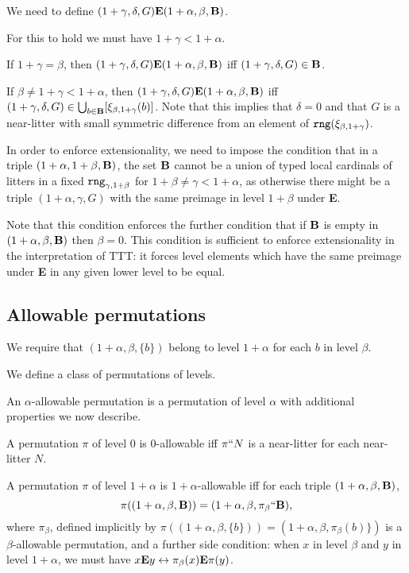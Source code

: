 \documentclass[12pt]{article}
\begin{document}
We need to define
$(1+\gamma,\delta,G) {\bf E} (1+\alpha,\beta,{\bf B})$.  

For this to hold we must have $1+\gamma<1+\alpha$.  

If $1+\gamma=\beta$, then $(1+\gamma,\delta,G) {\bf E} (1+\alpha,\beta,{\bf B})$ iff $(1+\gamma,\delta,G) \in {\bf B}$.  

If $\beta \neq 1+\gamma <1+\alpha$, then $(1+\gamma,\delta,G) {\bf E} (1+\alpha,\beta,{\bf B})$ iff $(1+\gamma,\delta,G) \in \bigcup_{b \in {\bf B}}[\xi_{\beta,1+\gamma}(b)]$.  Note that this implies
that $\delta=0$ and that $G$ is a near-litter with small symmetric difference from an element of ${\tt rng}(\xi_{\beta,1+\gamma})$.

In order to enforce extensionality, we need to impose the condition that in a triple $(1+\alpha,1+\beta,{\bf B})$, the set ${\bf B}$ cannot be a union of typed local cardinals of litters
in a fixed ${\tt rng}_{\gamma,1+\beta}$ for $1+\beta\neq \gamma<1+\alpha$, as otherwise there might be a triple $(1+\alpha,\gamma,G)$ with the same preimage in level $1+\beta$ under {\bf E}.


Note that this condition enforces the further condition that if ${\bf B}$ is empty in $(1+\alpha,\beta,{\bf B})$ then $\beta=0$.  This condition is sufficient to enforce extensionality in the interpretation of TTT:  it forces level elements which have the same preimage under {\bf E} in any given lower level to be equal.

\subsection{Allowable permutations}

We require that $(1+\alpha,\beta,\{b\})$ belong to level $1+\alpha$ for
each $b$ in level $\beta$.

We define a class of permutations of levels.

An $\alpha$-allowable permutation is a permutation of level $\alpha$ with additional properties we now describe.

A permutation $\pi$ of level 0 is 0-allowable iff $\pi``N$ is a near-litter for each near-litter $N$.

A permutation $\pi$ of level $1+\alpha$ is $1+\alpha$-allowable iff for each triple $(1+\alpha,\beta,{\bf B})$, $$\pi((1+\alpha,\beta,{\bf B})) = (1+\alpha,\beta,\pi_{\beta}``{\bf B}),$$ where $\pi_\beta$, defined implicitly by $\pi((1+\alpha,\beta,\{b\})) = (1+\alpha,\beta,\pi_\beta(b)\})$ is a $\beta$-allowable permutation, and a further side condition:  when $x$ in level $\beta$ and $y$ in level $1+\alpha$, we must have $x {\bf E} y \leftrightarrow \pi_{\beta}(x) {\bf E} \pi(y)$.
\end{document}
